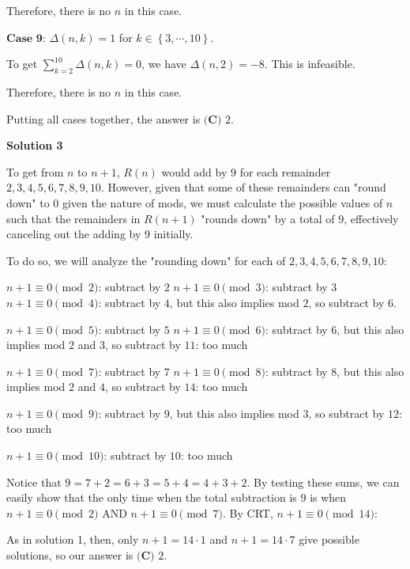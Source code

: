 \begin{enumerate}
 Therefore, there is no $n$ in this case.

 $\textbf{Case 9}$: $\Delta \left( n, k \right) = 1$ for $k \in \left\{3 , \cdots , 10 \right\}$.

 To get $\sum_{k = 2}^{10} \Delta \left( n, k \right) = 0$, we have $\Delta \left( n, 2 \right) = - 8$. This is infeasible.

 Therefore, there is no $n$ in this case.

 Putting all cases together, the answer is $\boxed{\textbf{(C) }2}$.

 


 



\textbf{Solution 3}

To get from $n$ to $n+1$, $R(n)$ would add by $9$ for each remainder $2, 3, 4, 5, 6, 7, 8, 9, 10$. However, given that some of these remainders can "round down" to $0$ given the nature of mods, we must calculate the possible values of $n$ such that the remainders in $R(n+1)$ "rounds down" by a total of $9$, effectively canceling out the adding by $9$ initially.

 
To do so, we will analyze the "rounding down" for each of $2, 3, 4, 5, 6, 7, 8, 9, 10$:

 
$n+1 \equiv 0 \pmod 2$:  subtract by $2$
$n+1 \equiv 0 \pmod 3$:  subtract by $3$
$n+1 \equiv 0 \pmod 4$:  subtract by $4$, but this also implies mod $2$, so subtract by $6$.

 $n+1 \equiv 0 \pmod 5$:  subtract by $5$
$n+1 \equiv 0 \pmod 6$:  subtract by $6$, but this also implies mod $2$ and $3$, so subtract by $11$: too much

 $n+1 \equiv 0 \pmod 7$:  subtract by $7$
$n+1 \equiv 0 \pmod 8$:  subtract by $8$, but this also implies mod $2$ and $4$, so subtract by $14$: too much

 $n+1 \equiv 0 \pmod 9$:  subtract by $9$, but this also implies mod $3$, so subtract by $12$: too much

 $n+1 \equiv 0 \pmod {10}$:  subtract by $10$: too much

 


 Notice that $9 = 7+2 = 6+3 = 5+4 = 4+3+2$. By testing these sums, we can easily show that the only time when the total subtraction is $9$ is when $n+1 \equiv 0 \pmod 2$ AND $n+1 \equiv 0 \pmod 7$. By CRT, $n+1 \equiv 0 \pmod {14}$:

 
As in solution 1, then, only $n+1=14 \cdot 1$ and $n+1=14 \cdot 7$ give possible solutions, so our answer is $\boxed{\textbf{(C) }2}$.


\end{enumerate}
